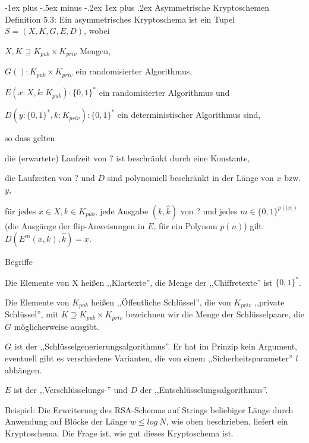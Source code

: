 \documentclass[a4paper]{article}
\makeatletter
\renewcommand{\subsubsection}{\@startsection{subsubsection}{3}{0mm}%
 {-1ex plus -.5ex minus -.2ex}%
 {1ex plus .2ex}%
 {\normalfont\small\bfseries}}
\makeatother
\begin{document}
\begin{multicols}{3}
        \subsubsection{Asymmetrische Kryptoschemen}
        Definition 5.3: Ein asymmetrisches Kryptoschema ist ein Tupel $S= (X,K,G,E,D)$, wobei
        \begin{itemize*}
            \item $X,K\supseteq K_{pub} \times K_{priv}$ Mengen,
            \item $G():K_{pub} \times K_{priv}$ ein randomisierter Algorithmus,
            \item $E(x:X,k:K_{pub}):\{0,1\}^*$ ein randomisierter Algorithmus und
            \item $D(y:\{0,1\}^*,k:K_{priv}):\{0,1\}^*$ ein deterministischer Algorithmus sind,
            \item so dass gelten
            \item die (erwartete) Laufzeit von $?$ ist beschränkt durch eine Konstante,
            \item die Laufzeiten von $?$ und $D$ sind polynomiell beschränkt in der Länge von $x$ bzw. $y$,
            \item für jedes $x\in X,k\in K_{pub}$, jede Ausgabe $(k,\hat{k})$ von $?$ und jedes $m\in\{0,1\}^{p(|x|)}$ (die Ausgänge der flip-Anweisungen in $E$, für ein Polynom $p(n)$) gilt: $D(E^m (x,k), \hat{k}) =x$.
        \end{itemize*}

        Begriffe
        \begin{itemize*}
            \item Die Elemente von X heißen ,,Klartexte'', die Menge der ,,Chiffretexte'' ist $\{0,1\}^*$.
            \item Die Elemente von $K_{pub}$ heißen ,,Öffentliche Schlüssel'', die von $K_{priv}$ ,,private Schlüssel'', mit $K\supseteq K_{pub} \times K_{priv}$ bezeichnen wir die Menge der Schlüsselpaare, die $G$ möglicherweise ausgibt.
            \item $G$ ist der ,,Schlüsselgenerierungsalgorithmus''. Er hat im Prinzip kein Argument, eventuell gibt es verschiedene Varianten, die von einem ,,Sicherheitsparameter'' $l$ abhängen.
            \item $E$ ist der ,,Verschlüsselungs-'' und $D$ der ,,Entschlüsselungsalgorithmus''.
        \end{itemize*}

        Beispiel: Die Erweiterung des RSA-Schemas auf Strings beliebiger Länge durch Anwendung auf Blöcke der Länge $w\leq log\ N$, wie oben beschrieben, liefert ein Kryptoschema. Die Frage ist, wie gut dieses Kryptoschema ist.


\end{multicols}
\end{document}
